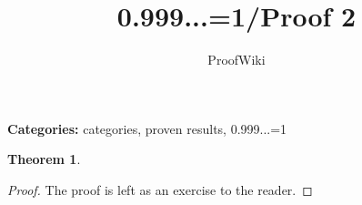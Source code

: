 \documentclass{article}
\title{0.999...=1/Proof 2}
\author{ProofWiki}
\date{}
\newtheorem{theorem}{Theorem}
\begin{document}
\maketitle

\noindent\textbf{Categories:} categories, proven results, 0.999...=1

\begin{theorem}

\end{theorem}

\begin{proof}
The proof is left as an exercise to the reader.
\end{proof}
\end{document}
